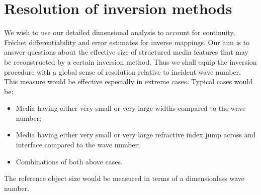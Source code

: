 \documentclass[12pt,twoside]{report}
\begin{document}
\section{Resolution of inversion methods} 
We wish to use our detailed dimensional analysis to account for continuity, Fr\'echet differentiability and error estimates for inverse mappings. Our aim is to answer questions about the effective size of structured media features that may be reconstructed by a certain inversion method. Thus we shall equip the inversion procedure with a global sense of resolution relative to incident wave number.\\
This measure would be effective especially in extreme cases. Typical cases would be:
\begin{itemize}
\item Media having either very small or very large widths compared to the wave number;
\item Media having either very small or very large refractive index jump across and interface compared to the wave number;
\item Combinations of both above cases.
\end{itemize} 
The reference object size would be measured in terms of a dimensionless wave number.
\end{document}
